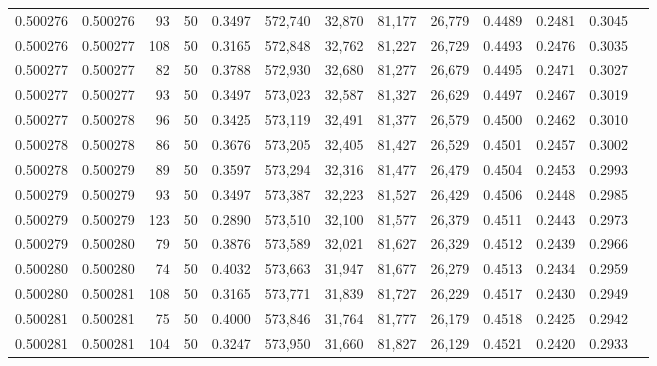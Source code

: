\begin{tabular}{rrrrrrrrrrrrr}
0.500276 & 0.500276 &    93 &  50 &                                     0.3497 & 572,740 &  32,870 &  81,177 &  26,779 & 0.4489 & 0.2481 & 0.3045 \\
0.500276 & 0.500277 &   108 &  50 &                                     0.3165 & 572,848 &  32,762 &  81,227 &  26,729 & 0.4493 & 0.2476 & 0.3035 \\
0.500277 & 0.500277 &    82 &  50 &                                     0.3788 & 572,930 &  32,680 &  81,277 &  26,679 & 0.4495 & 0.2471 & 0.3027 \\
0.500277 & 0.500277 &    93 &  50 &                                     0.3497 & 573,023 &  32,587 &  81,327 &  26,629 & 0.4497 & 0.2467 & 0.3019 \\
0.500277 & 0.500278 &    96 &  50 &                                     0.3425 & 573,119 &  32,491 &  81,377 &  26,579 & 0.4500 & 0.2462 & 0.3010 \\
0.500278 & 0.500278 &    86 &  50 &                                     0.3676 & 573,205 &  32,405 &  81,427 &  26,529 & 0.4501 & 0.2457 & 0.3002 \\
0.500278 & 0.500279 &    89 &  50 &                                     0.3597 & 573,294 &  32,316 &  81,477 &  26,479 & 0.4504 & 0.2453 & 0.2993 \\
0.500279 & 0.500279 &    93 &  50 &                                     0.3497 & 573,387 &  32,223 &  81,527 &  26,429 & 0.4506 & 0.2448 & 0.2985 \\
0.500279 & 0.500279 &   123 &  50 &                                     0.2890 & 573,510 &  32,100 &  81,577 &  26,379 & 0.4511 & 0.2443 & 0.2973 \\
0.500279 & 0.500280 &    79 &  50 &                                     0.3876 & 573,589 &  32,021 &  81,627 &  26,329 & 0.4512 & 0.2439 & 0.2966 \\
0.500280 & 0.500280 &    74 &  50 &                                     0.4032 & 573,663 &  31,947 &  81,677 &  26,279 & 0.4513 & 0.2434 & 0.2959 \\
0.500280 & 0.500281 &   108 &  50 &                                     0.3165 & 573,771 &  31,839 &  81,727 &  26,229 & 0.4517 & 0.2430 & 0.2949 \\
0.500281 & 0.500281 &    75 &  50 &                                     0.4000 & 573,846 &  31,764 &  81,777 &  26,179 & 0.4518 & 0.2425 & 0.2942 \\
0.500281 & 0.500281 &   104 &  50 &                                     0.3247 & 573,950 &  31,660 &  81,827 &  26,129 & 0.4521 & 0.2420 & 0.2933 \\

\end{tabular}
